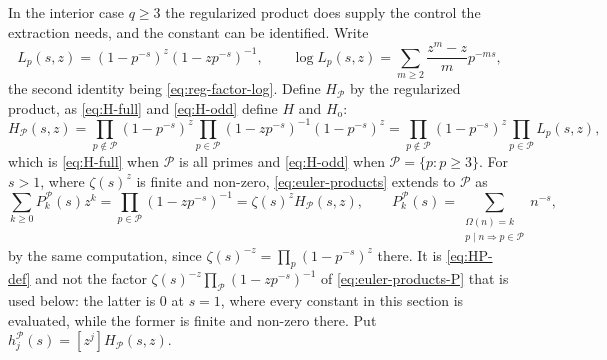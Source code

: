\documentclass[11pt]{amsart}
\theoremstyle{plain}
\theoremstyle{definition}
\begin{document}
In the interior case $q\geq3$ the regularized product does supply the control
the extraction needs, and the constant can be identified. Write
\begin{equation}\label{eq:local-reg}
 L_p(s,z)=(1-p^{-s})^z(1-zp^{-s})^{-1},
 \qquad
 \log L_p(s,z)=\sum_{m\geq2}\frac{z^m-z}{m}p^{-ms},
\end{equation}
the second identity being \eqref{eq:reg-factor-log}. Define $H_{\mathcal P}$ by the regularized
product, as \eqref{eq:H-full} and \eqref{eq:H-odd} define $H$ and
$H_{\mathrm o}$:
\begin{equation}\label{eq:HP-def}
  H_{\mathcal P}(s,z)
   =\prod_{p\notin\mathcal P}(1-p^{-s})^{z}
    \prod_{p\in\mathcal P}(1-zp^{-s})^{-1}(1-p^{-s})^{z}
   =\prod_{p\notin\mathcal P}(1-p^{-s})^{z}
    \prod_{p\in\mathcal P}L_p(s,z),
\end{equation}
which is \eqref{eq:H-full} when $\mathcal P$ is all primes and
\eqref{eq:H-odd} when $\mathcal P=\{p:p\geq3\}$. For $s>1$, where
$\zeta(s)^{z}$ is finite and non-zero, \eqref{eq:euler-products} extends to
$\mathcal P$ as
\begin{equation}\label{eq:euler-products-P}
  \sum_{k\geq0}P_k^{\mathcal P}(s)z^k
   =\prod_{p\in\mathcal P}(1-zp^{-s})^{-1}
   =\zeta(s)^zH_{\mathcal P}(s,z),
  \qquad
  P_k^{\mathcal P}(s)=\sum_{\substack{\Omega(n)=k\\ p\mid n\Rightarrow p\in\mathcal P}}n^{-s},
\end{equation}
by the same computation, since
$\zeta(s)^{-z}=\prod_p(1-p^{-s})^{z}$ there. It is
\eqref{eq:HP-def} and not the factor $\zeta(s)^{-z}\prod_{\mathcal
P}(1-zp^{-s})^{-1}$ of \eqref{eq:euler-products-P} that is used below: the
latter is $0$ at $s=1$, where every constant in this section is evaluated,
while the former is finite and non-zero there. Put
$h_j^{\mathcal P}(s)=[z^j]H_{\mathcal P}(s,z)$.
\end{document}
